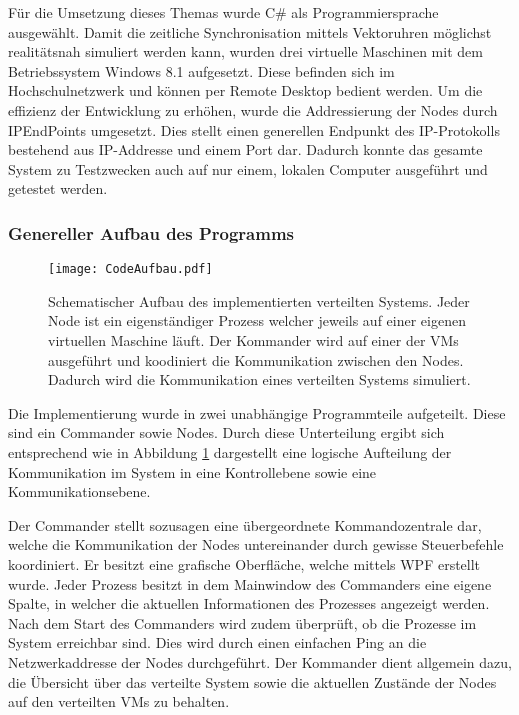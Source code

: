 Für die Umsetzung dieses Themas wurde C\# als Programmiersprache ausgewählt. Damit die zeitliche Synchronisation mittels Vektoruhren möglichst realitätsnah simuliert werden kann, wurden drei virtuelle Maschinen mit dem Betriebssystem Windows 8.1 aufgesetzt. Diese befinden sich im Hochschulnetzwerk und können per Remote Desktop bedient werden. Um die effizienz der Entwicklung zu erhöhen, wurde die Addressierung der Nodes durch IPEndPoints umgesetzt. Dies stellt einen generellen Endpunkt des IP-Protokolls bestehend aus IP-Addresse und einem Port dar. Dadurch konnte das gesamte System zu Testzwecken auch auf nur einem, lokalen Computer ausgeführt und getestet werden.

\subsubsection{Genereller Aufbau des Programms}

\begin{figure}[ht]
	\centering
	\texttt{[image: CodeAufbau.pdf]}
	\caption[Aufbau der Anwendung]{Schematischer Aufbau des implementierten verteilten Systems. Jeder Node ist ein eigenständiger Prozess welcher jeweils auf einer eigenen virtuellen Maschine läuft. Der Kommander wird auf einer der VMs ausgeführt und koodiniert die Kommunikation zwischen den Nodes. Dadurch wird die Kommunikation eines verteilten Systems simuliert.}
	\label{figure:systemaufbau}
\end{figure}

Die Implementierung wurde in zwei unabhängige Programmteile aufgeteilt. Diese sind ein Commander sowie Nodes. Durch diese Unterteilung ergibt sich entsprechend wie in Abbildung \ref*{figure:systemaufbau} dargestellt eine logische Aufteilung der Kommunikation im System in eine Kontrollebene sowie eine Kommunikationsebene.

Der Commander stellt sozusagen eine übergeordnete Kommandozentrale dar, welche die Kommunikation der Nodes untereinander durch gewisse Steuerbefehle koordiniert. Er besitzt eine grafische Oberfläche, welche mittels WPF erstellt wurde. Jeder Prozess besitzt in dem Mainwindow des Commanders eine eigene Spalte, in welcher die aktuellen Informationen des Prozesses angezeigt werden. Nach dem Start des Commanders wird zudem überprüft, ob die Prozesse im System erreichbar sind. Dies wird durch einen einfachen Ping an die Netzwerkaddresse der Nodes durchgeführt. Der Kommander dient allgemein dazu, die Übersicht über das verteilte System sowie die aktuellen Zustände der Nodes auf den verteilten VMs zu behalten. 

